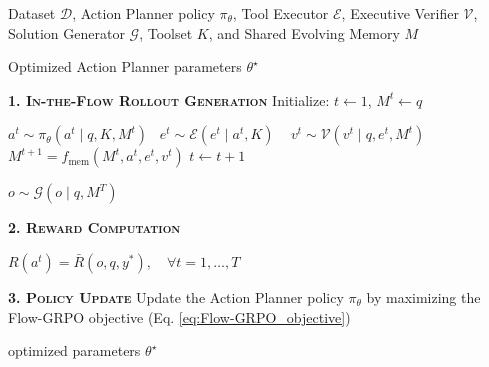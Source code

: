 \begin{algorithm}
\caption{In-the-Flow Optimization for \model}
\label{alg:agentflow}
\begin{algorithmic}[1]
\REQUIRE Dataset $\mathcal{D}$, Action Planner policy $\pi_\theta$, Tool Executor $\mathcal{E}$, Executive Verifier $\mathcal{V}$, Solution Generator $\mathcal{G}$, Toolset $K$, and Shared Evolving Memory ${M}$


\ENSURE Optimized Action Planner parameters $\theta^\star$


    
    \STATE \textbf{\textsc{1. In-the-Flow Rollout Generation}}
    \STATE Initialize: $t \leftarrow 1$, $M^t \leftarrow q$

    \REPEAT
        \STATE $a^{t} \sim \pi_\theta(a^t \mid q, K, M^{t})$  \
        \STATE $e^{t} \sim \mathcal{E}(e^t \mid a^{t}, K)$ \ 
        \STATE $v^{t} \sim \mathcal{V}(v^{t} \mid q, e^{t}, M^{t})$ 
        \STATE $M^{t+1} = f_{\text{mem}}\!(M^t, a^t, e^t, v^t)$ \COMMENT{\textit{Update Memory}} 
        \STATE $t \leftarrow t + 1$
    
    \STATE $o \sim \mathcal{G}(o \mid q, M^T)$ 

    \STATE \textbf{\textsc{2. Reward Computation}}
    
    \STATE $R(a^t) = \bar{R}(o, q, y^*), \quad \forall t = 1,\dots,T$


\STATE \textbf{\textsc{3. Policy Update}}
\STATE Update the Action Planner policy $\pi_\theta$ by maximizing the Flow-GRPO objective (Eq. \ref{eq:Flow-GRPO_objective})
    \ENDFOR
\ENDFOR

\RETURN optimized parameters $\theta^\star$
\end{algorithmic}
\end{algorithm}